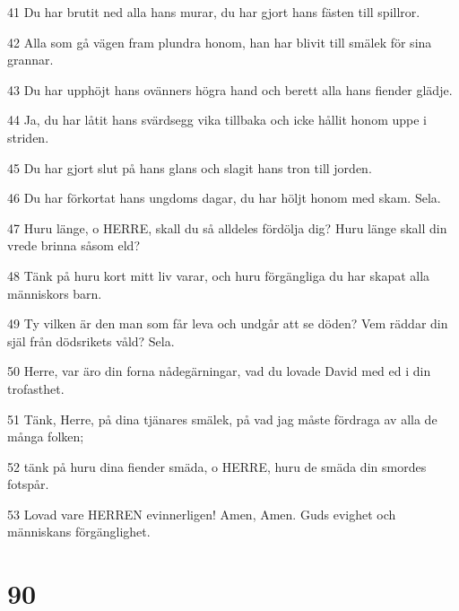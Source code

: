 \par 41 Du har brutit ned alla hans murar, du har gjort hans fästen till spillror.
\par 42 Alla som gå vägen fram plundra honom, han har blivit till smälek för sina grannar.
\par 43 Du har upphöjt hans ovänners högra hand och berett alla hans fiender glädje.
\par 44 Ja, du har låtit hans svärdsegg vika tillbaka och icke hållit honom uppe i striden.
\par 45 Du har gjort slut på hans glans och slagit hans tron till jorden.
\par 46 Du har förkortat hans ungdoms dagar, du har höljt honom med skam. Sela.
\par 47 Huru länge, o HERRE, skall du så alldeles fördölja dig? Huru länge skall din vrede brinna såsom eld?
\par 48 Tänk på huru kort mitt liv varar, och huru förgängliga du har skapat alla människors barn.
\par 49 Ty vilken är den man som får leva och undgår att se döden? Vem räddar din själ från dödsrikets våld? Sela.
\par 50 Herre, var äro din forna nådegärningar, vad du lovade David med ed i din trofasthet.
\par 51 Tänk, Herre, på dina tjänares smälek, på vad jag måste fördraga av alla de många folken;
\par 52 tänk på huru dina fiender smäda, o HERRE, huru de smäda din smordes fotspår.
\par 53 Lovad vare HERREN evinnerligen! Amen, Amen. Guds evighet och människans förgänglighet.

\chapter{90}

